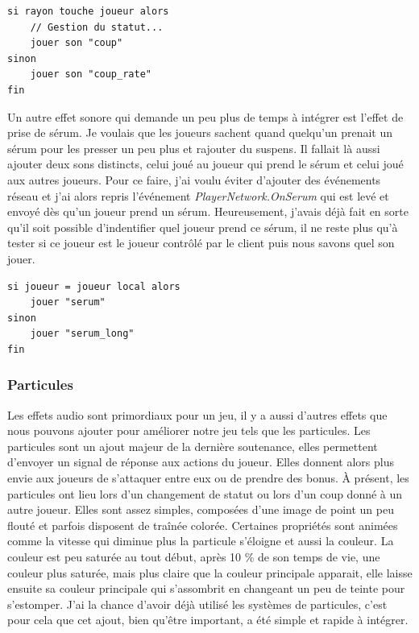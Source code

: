 \documentclass{article}
\begin{document}
\begin{lstlisting}
si rayon touche joueur alors
	// Gestion du statut...
	jouer son "coup"
sinon
	jouer son "coup_rate"
fin
\end{lstlisting}


Un autre effet sonore qui demande un peu plus de temps à intégrer est l'effet de prise de sérum. Je voulais que les joueurs sachent quand quelqu'un prenait un sérum pour les presser un peu plus et rajouter du suspens. Il fallait là aussi ajouter deux sons distincts, celui joué au joueur qui prend le sérum et celui joué aux autres joueurs. Pour ce faire, j'ai voulu éviter d'ajouter des événements réseau et j'ai alors repris l'événement \emph{PlayerNetwork.OnSerum} qui est levé et envoyé dès qu'un joueur prend un sérum. Heureusement, j'avais déjà fait en sorte qu'il soit possible d'indentifier quel joueur prend ce sérum, il ne reste plus qu'à tester si ce joueur est le joueur contrôlé par le client puis nous savons quel son jouer.


\begin{lstlisting}
si joueur = joueur local alors
	jouer "serum"
sinon
	jouer "serum_long"
fin
\end{lstlisting}


\newpage
\subsubsection{Particules}


Les effets audio sont primordiaux pour un jeu, il y a aussi d'autres effets que nous pouvons ajouter pour améliorer notre jeu tels que les particules.
Les particules sont un ajout majeur de la dernière soutenance, elles permettent d'envoyer un signal de réponse aux actions du joueur. Elles donnent alors plus envie aux joueurs de s'attaquer entre eux ou de prendre des bonus.
À présent, les particules ont lieu lors d'un changement de statut ou lors d'un coup donné à un autre joueur. Elles sont assez simples, composées d'une image de point un peu flouté et parfois disposent de traînée colorée. Certaines propriétés sont animées comme la vitesse qui diminue plus la particule s'éloigne et aussi la couleur. La couleur est peu saturée au tout début, après 10 \% de son temps de vie, une couleur plus saturée, mais plus claire que la couleur principale apparait, elle laisse ensuite sa couleur principale qui s'assombrit en changeant un peu de teinte pour s'estomper.
J'ai la chance d'avoir déjà utilisé les systèmes de particules, c'est pour cela que cet ajout, bien qu'être important, a été simple et rapide à intégrer.
\end{document}
